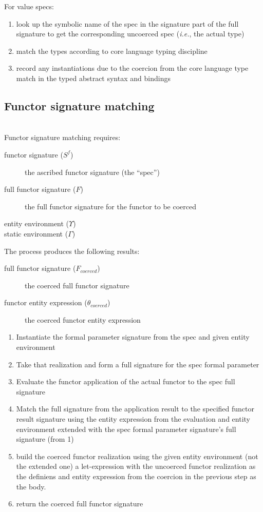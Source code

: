For value specs:
\begin{enumerate}
\item look up the symbolic name of the spec in the signature part of the full signature to get the corresponding uncoerced spec (\emph{i.e.}, the actual type)
\item match the types according to core language typing discipline
\item record any instantiations due to the coercion from the core language type match in the typed abstract syntax and bindings
\end{enumerate}

\subsection{Functor signature matching}
\\
Functor signature matching requires:
\begin{description}
\item[functor signature ($S^f$)] the ascribed functor signature (the ``spec'')
\item[full functor signature ($F$)] the full functor signature for the functor to be coerced
\item[entity environment ($\Upsilon$)]
\item[static environment ($\Gamma$)]
\end{description}

The process produces the following results:
\begin{description}
\item[full functor signature ($F_{coerced}$)] the coerced full functor signature
\item[functor entity expression ($\theta_{coerced}$)] the coerced functor entity expression
\end{description}

\begin{enumerate}
\item Instantiate the formal parameter signature from the spec and given entity environment
\item Take that realization and form a full signature for the spec formal parameter
\item Evaluate the functor application of the actual functor to the spec full signature 
\item Match the full signature from the application result to the specified functor result signature using the entity expression from the evaluation and entity environment extended with the spec formal parameter signature's full signature (from 1)
\item build the coerced functor realization using the given entity environment (not the extended one) a let-expression with the uncoerced functor realization as the definiens and entity expression from the coercion in the previous step as the body.
\item return the coerced full functor signature
\end{enumerate}

